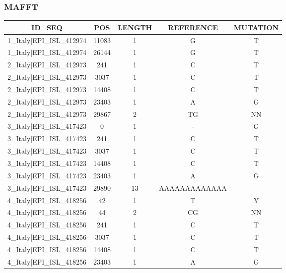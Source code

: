 \documentclass[a4paper,10pt]{article}
\begin{document}
\newpage
\subsubsection{MAFFT}

\begin{longtable}{@{}ccccc@{}}
\toprule
\textbf{ID\_SEQ} & \textbf{POS} & \textbf{LENGTH} & \textbf{REFERENCE} & \textbf{MUTATION} \\* \midrule
\endfirsthead
%
\cline{1-5}
\endhead
%
1\_Italy|EPI\_ISL\_412974 & 11083 & 1 & G & T \\* \midrule
1\_Italy|EPI\_ISL\_412974 & 26144 & 1 & G & T \\* \midrule
2\_Italy|EPI\_ISL\_412973 & 241 & 1 & C & T \\* \midrule
2\_Italy|EPI\_ISL\_412973 & 3037 & 1 & C & T \\* \midrule
2\_Italy|EPI\_ISL\_412973 & 14408 & 1 & C & T \\* \midrule
2\_Italy|EPI\_ISL\_412973 & 23403 & 1 & A & G \\* \midrule
2\_Italy|EPI\_ISL\_412973 & 29867 & 2 & TG & NN \\* \midrule
3\_Italy|EPI\_ISL\_417423 & 0 & 1 & - & G \\* \midrule
3\_Italy|EPI\_ISL\_417423 & 241 & 1 & C & T \\* \midrule
3\_Italy|EPI\_ISL\_417423 & 3037 & 1 & C & T \\* \midrule
3\_Italy|EPI\_ISL\_417423 & 14408 & 1 & C & T \\* \midrule
3\_Italy|EPI\_ISL\_417423 & 23403 & 1 & A & G \\* \midrule
3\_Italy|EPI\_ISL\_417423 & 29890 & 13 & AAAAAAAAAAAAA & ------------- \\* \midrule
4\_Italy|EPI\_ISL\_418256 & 42 & 1 & T & Y \\* \midrule
4\_Italy|EPI\_ISL\_418256 & 44 & 2 & CG & NN \\* \midrule
4\_Italy|EPI\_ISL\_418256 & 241 & 1 & C & T \\* \midrule
4\_Italy|EPI\_ISL\_418256 & 3037 & 1 & C & T \\* \midrule
4\_Italy|EPI\_ISL\_418256 & 14408 & 1 & C & T \\* \midrule
4\_Italy|EPI\_ISL\_418256 & 23403 & 1 & A & G \\* \midrule

\end{longtable}
\end{document}
